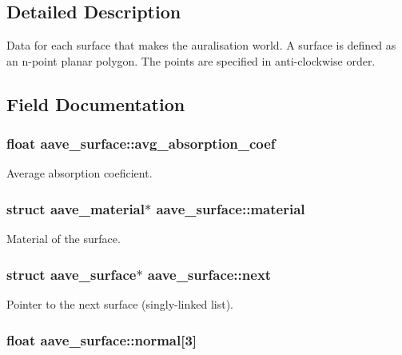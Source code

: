 \subsection{Detailed Description}
Data for each surface that makes the auralisation world. A surface is defined as an n-\/point planar polygon. The points are specified in anti-\/clockwise order. 

\subsection{Field Documentation}
\hypertarget{structaave__surface_a9a12af46ca455c786a791ce484afdbd4}{
\subsubsection[{avg\-\_\-absorption\-\_\-coef}]{\setlength{\rightskip}{0pt plus 5cm}float aave\-\_\-surface\-::avg\-\_\-absorption\-\_\-coef}}\label{structaave__surface_a9a12af46ca455c786a791ce484afdbd4}
Average absorption coeficient. \hypertarget{structaave__surface_a6dfe11d4b9e97f9167a39669513a4b0a}{
\subsubsection[{material}]{\setlength{\rightskip}{0pt plus 5cm}struct {\bf aave\-\_\-material}$\ast$ aave\-\_\-surface\-::material}}\label{structaave__surface_a6dfe11d4b9e97f9167a39669513a4b0a}
Material of the surface. \hypertarget{structaave__surface_a4437c02a050c5cd3d99272bb3d5ebd7e}{
\subsubsection[{next}]{\setlength{\rightskip}{0pt plus 5cm}struct {\bf aave\-\_\-surface}$\ast$ aave\-\_\-surface\-::next}}\label{structaave__surface_a4437c02a050c5cd3d99272bb3d5ebd7e}
Pointer to the next surface (singly-\/linked list). \hypertarget{structaave__surface_a8b5aa68de342d90a056663c90fc31f28}{
\subsubsection[{normal}]{\setlength{\rightskip}{0pt plus 5cm}float aave\-\_\-surface\-::normal\mbox{[}3\mbox{]}}}\label{structaave__surface_a8b5aa68de342d90a056663c90fc31f28}
